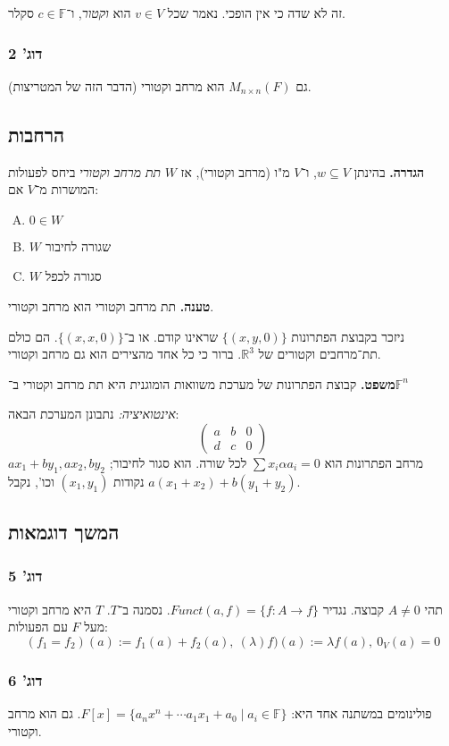 \documentclass[]{article}
\newcommand\F     {\mathbb{F}}
\newcommand\R     {\mathbb{R}}
\begin{document}
	 זה לא שדה כי אין הופכי. נאמר שכל $v \in V$ הוא \textit{וקטור}, ו־$c \in \F$ סקלר. 
	 \subsubsection{דוג' 2}
	 גם $M_{n \times n}(F)$ הוא מרחב וקטורי (הדבר הזה של המטריצות). 
	 \subsection{הרחבות}
	 \textbf{הגדרה. }בהינתן $w \subseteq V$, ו־$V$ מ"ו (מרחב וקטורי), אז $W$ \textit{תת מרחב וקטורי} ביחס לפעולות המושרות מ־$V$ אם: 
	 \begin{enumerate}[(A)]
	 	\item $0 \in W$
	 	\item $W$ שגורה לחיבור
	 	\item $W$ סגורה לכפל
	 \end{enumerate}
	 
	 \textbf{טענה. }תת מרחב וקטורי הוא מרחב וקטורי. 
	 
	 ניזכר בקבוצת הפתרונות $\{(x, y, 0)\}$ שראינו קודם. או ב־$\{(x, x, 0)\}$. הם כולם תת־מרחבים וקטורים של $\R^3$. ברור כי כל אחד מהצירים הוא גם מרחב וקטורי. 
	 
	 \textbf{משפט. }קבוצת הפתרונות של מערכת משוואות הומוגנית היא תת מרחב וקטורי ב־$\F^n$
	 
	 \textit{אינטואיציה: }נתבונן המערכת הבאה: 
	 \[ \begin{pmatrix}
	 	a & b & 0 \\
	 	d & c & 0
	 \end{pmatrix} \]
	 מרחב הפתרונות הוא $\sum x_i \alpha a_i = 0 $ לכל שורה. הוא סגור לחיבור; $ax_1 + by_1, ax_2, by_2$ נקודות $(x_1, y_1)$ וכו', נקבל $a(x_1 + x_2) + b(y_1 + y_2)$. 
	 
	 \subsection{המשך דוגמאות}
	 \subsubsection{דוג' 5}
	 תהי $A \neq 0$ קבוצה. נגדיר $Funct(a, f) = \{f \colon A \to f\}$. נסמנה ב־$T$. $T$ היא מרחב וקטורי מעל $F$ עם הפעולות: 
	 \[ (f_1 = f_2)(a) := f_1(a) + f_2(a), \ (\lambda) f)(a) := \lambda f(a), \ 0_V(a) = 0 \]
	 
	 \subsubsection{דוג' 6}
	 פולינומים במשתנה אחד היא: 
	 $F[x] = \{a_nx^n + \cdots a_1x_1 + a_0 \mid a_i \in \F\}$. גם הוא מרחב וקטורי. 
	 
\end{document}
